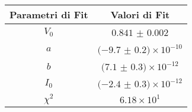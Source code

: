 \begin{tabular}{cc}
\hline
	Parametri di Fit & Valori di Fit\\ 
\hline
	$V_0$ & $0.841$ $\pm$ $0.002$ \\
	$a$ & $(-9.7$ $\pm$ $0.2)\times 10^{-10}$ \\
	$b$ & $(7.1$ $\pm$ $0.3)\times 10^{-12}$ \\
	$I_0$ & $(-2.4$ $\pm$ $0.3)\times 10^{-12}$ \\
	$\chi^2$ & $6.18\times 10^{1}$ \\
\hline
\end{tabular}

